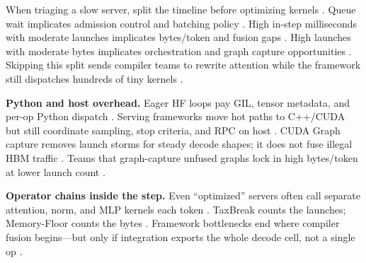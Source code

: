 When triaging a slow server, split the timeline before optimizing kernels \citep{patel2025llminference,memoryfloor2026,taxbreak2026,yirage2026,chen2020compilerbasedhardw,kwon2023vllm,dlbook,nvidia2024cudagraphs,dao2022flashattention,liu2024deepseekv3,semianalysis2024tma,amd2024xdna,amd2024aie,dao2023flashdecoding,nvidia2022hopper,dlbook}. Queue wait implicates admission control and batching policy \citep{kwon2023vllm,patel2025llminference,memoryfloor2026,dlbook,yirage2026,chen2020compilerbasedhardw,taxbreak2026,liu2024deepseekv3,nvidia2024cudagraphs,dao2022flashattention,semianalysis2024tma,amd2024aie,amd2024xdna,dlbook}. High in-step milliseconds with moderate launches implicates bytes/token and fusion gaps \citep{taxbreak2026,memoryfloor2026,yirage2026,chen2020compilerbasedhardw,patel2025llminference,dao2022flashattention,dao2023flashdecoding,kwon2023vllm,dlbook}. High launches with moderate bytes implicates orchestration and graph capture opportunities \citep{memoryfloor2026,nvidia2024cudagraphs,taxbreak2026,patel2025llminference,yirage2026,chen2020compilerbasedhardw,kwon2023vllm,dlbook}. Skipping this split sends compiler teams to rewrite attention while the framework still dispatches hundreds of tiny kernels \citep{taxbreak2026,memoryfloor2026,patel2025llminference,yirage2026,chen2020compilerbasedhardw,kwon2023vllm,dlbook}.

\textbf{Python and host overhead.} Eager HF loops pay GIL, tensor metadata, and per-op Python dispatch \citep{patel2025llminference,dlbook,taxbreak2026,memoryfloor2026}. Serving frameworks move hot paths to C++/CUDA but still coordinate sampling, stop criteria, and RPC on host \citep{kwon2023vllm,patel2025llminference,nvidia2024cudagraphs,memoryfloor2026}. CUDA Graph capture removes launch storms for steady decode shapes; it does not fuse illegal HBM traffic \citep{memoryfloor2026,nvidia2024cudagraphs,taxbreak2026,yirage2026,chen2020compilerbasedhardw,dao2022flashattention}. Teams that graph-capture unfused graphs lock in high bytes/token at lower launch count \citep{memoryfloor2026,taxbreak2026,patel2025llminference,nvidia2024cudagraphs,yirage2026}.

\textbf{Operator chains inside the step.} Even ``optimized'' servers often call separate attention, norm, and MLP kernels each token \citep{taxbreak2026,kwon2023vllm,patel2025llminference,dao2022flashattention,dao2023flashdecoding,memoryfloor2026,yirage2026,chen2020compilerbasedhardw,liu2024deepseekv3}. TaxBreak counts the launches; Memory-Floor counts the bytes \citep{taxbreak2026,memoryfloor2026}. Framework bottlenecks end where compiler fusion begins---but only if integration exports the whole decode cell, not a single op \citep{yirage2026,chen2020compilerbasedhardw,patel2025llminference,kwon2023vllm,taxbreak2026,memoryfloor2026,nvidia2024cudagraphs,dao2022flashattention,dlbook}.


